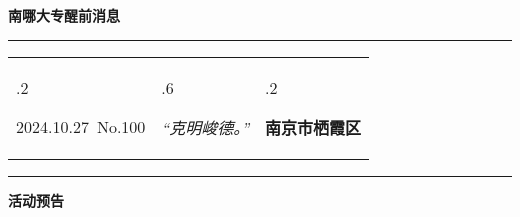 \documentclass[letterpaper, 12pt]{article}
\begin{document}
\begin{center}
    \Huge\textbf{南哪大专醒前消息}
\end{center}
\vspace{4mm}
\hrule
\renewcommand\tabularxcolumn[1]{m{#1}}
\begin{tabularx}{\textwidth}{>{\hsize.2\hsize}X>{\hsize.6\hsize}X>{\hsize.2\hsize}X}
    \begin{flushleft}
        2024.10.27\, No.100
    \end{flushleft}
    &
    \begin{center}
        \textit{“克明峻德。”}
    \end{center}
    &
    \begin{flushright}
        \textbf{南京市栖霞区}
    \end{flushright}
\end{tabularx}
\vspace{-3.5mm}
\hrule
\vspace{4mm}
\centerline{\huge\textbf{活动预告}}
\end{document}
